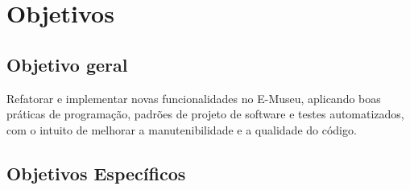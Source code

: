 \section{Objetivos}\label{sec:objetivos}

\subsection{Objetivo geral}\label{subsec:objetivoGeral}

Refatorar e implementar novas funcionalidades no E-Museu, aplicando boas práticas de programação, padrões de projeto de software e testes automatizados, com o intuito de melhorar a manutenibilidade e a qualidade do código.


\subsection{Objetivos Específicos}\label{subsec:objetivoEspecificos}

